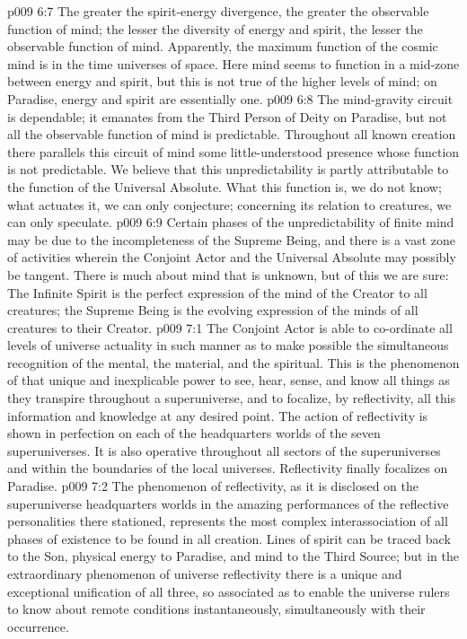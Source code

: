 \vs p009 6:7 The greater the spirit\hyp{}energy divergence, the greater the observable function of mind; the lesser the diversity of energy and spirit, the lesser the observable function of mind. Apparently, the maximum function of the cosmic mind is in the time universes of space. Here mind seems to function in a mid\hyp{}zone between energy and spirit, but this is not true of the higher levels of mind; on Paradise, energy and spirit are essentially one.
\vs p009 6:8 \pc The mind\hyp{}gravity circuit is dependable; it emanates from the Third Person of Deity on Paradise, but not all the observable function of mind is predictable. Throughout all known creation there parallels this circuit of mind some little\hyp{}understood presence whose function is not predictable. We believe that this unpredictability is partly attributable to the function of the Universal Absolute. What this function is, we do not know; what actuates it, we can only conjecture; concerning its relation to creatures, we can only speculate.
\vs p009 6:9 \pc Certain phases of the unpredictability of finite mind may be due to the incompleteness of the Supreme Being, and there is a vast zone of activities wherein the Conjoint Actor and the Universal Absolute may possibly be tangent. There is much about mind that is unknown, but of this we are sure: The Infinite Spirit is the perfect expression of the mind of the Creator to all creatures; the Supreme Being is the evolving expression of the minds of all creatures to their Creator.
\vs p009 7:1 The Conjoint Actor is able to co\hyp{}ordinate all levels of universe actuality in such manner as to make possible the simultaneous recognition of the mental, the material, and the spiritual. This is the phenomenon of  that unique and inexplicable power to see, hear, sense, and know all things as they transpire throughout a superuniverse, and to focalize, by reflectivity, all this information and knowledge at any desired point. The action of reflectivity is shown in perfection on each of the headquarters worlds of the seven superuniverses. It is also operative throughout all sectors of the superuniverses and within the boundaries of the local universes. Reflectivity finally focalizes on Paradise.
\vs p009 7:2 The phenomenon of reflectivity, as it is disclosed on the superuniverse headquarters worlds in the amazing performances of the reflective personalities there stationed, represents the most complex interassociation of all phases of existence to be found in all creation. Lines of spirit can be traced back to the Son, physical energy to Paradise, and mind to the Third Source; but in the extraordinary phenomenon of universe reflectivity there is a unique and exceptional unification of all three, so associated as to enable the universe rulers to know about remote conditions instantaneously, simultaneously with their occurrence.
